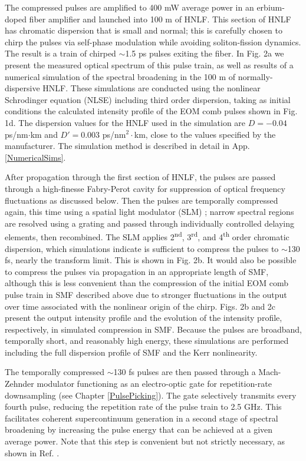 The compressed pulses are amplified to 400 mW average power in an erbium-doped fiber amplifier and launched into 100 m of HNLF. This section of HNLF has chromatic dispersion that is small and normal; this is carefully chosen to chirp the pulses via self-phase modulation while avoiding soliton-fission dynamics. The result is a train of chirped $\sim$1.5 ps pulses exiting the fiber.  In Fig. 2a we present the measured optical spectrum of this pulse train, as well as results of a numerical simulation of the spectral broadening in the 100 m of normally-dispersive HNLF. These simulations are conducted using the nonlinear Schrodinger equation (NLSE) including third order dispersion, taking as initial conditions the calculated intensity profile of the EOM comb pulses shown in Fig. 1d. The dispersion values for the HNLF used in the simulation are $D=-0.04$  ps/nm$\cdot$km and $D'=0.003$ ps/nm$^2\cdot$km, close to the values specified by the manufacturer. The simulation method is described in detail in App. \ref{NumericalSims}.

After propagation through the first section of HNLF, the pulses are passed through a high-finesse Fabry-Perot cavity for suppression of optical frequency fluctuations as discussed below. Then the pulses are temporally compressed again, this time using a spatial light modulator (SLM) \cite{Weiner2000}; narrow spectral regions are resolved using a grating and passed through individually controlled delaying elements, then recombined. The SLM applies 2\textsuperscript{nd}, 3\textsuperscript{rd}, and 4\textsuperscript{th} order chromatic dispersion, which simulations indicate is sufficient to compress the pulses to $\sim$130 fs, nearly the transform limit. This is shown in Fig. 2b. It would also be possible to compress the pulses via propagation in an appropriate length of SMF, although this is less convenient than the compression of the initial EOM comb pulse train in SMF described above due to stronger fluctuations in the output over time associated with the nonlinear origin of the chirp. Figs. 2b and 2c present the output intensity profile and the evolution of the intensity profile, respectively, in simulated compression in SMF. Because the pulses are broadband, temporally short, and reasonably high energy, these simulations are performed including the full dispersion profile of SMF and the Kerr nonlinearity.






The temporally compressed $\sim$130 fs pulses are then passed through a Mach-Zehnder modulator functioning as an electro-optic gate for repetition-rate downsampling (see Chapter \ref{PulsePicking}). The gate selectively transmits every fourth pulse, reducing the repetition rate of the pulse train to 2.5 GHz. This facilitates coherent supercontinuum generation in a second stage of spectral broadening by increasing the pulse energy that can be achieved at a given average power. Note that this step is convenient but not strictly necessary, as shown in Ref. \cite{Beha2017}. 

